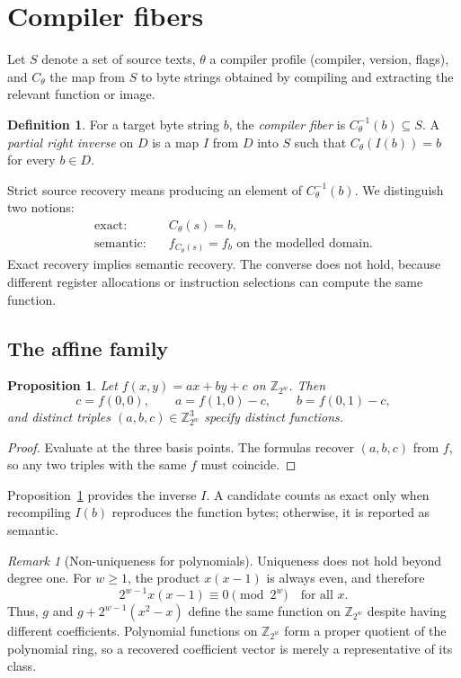 \documentclass[11pt]{article}
\newtheorem{proposition}[theorem]{Proposition}
\theoremstyle{definition}
\newtheorem{definition}[theorem]{Definition}
\theoremstyle{remark}
\newtheorem{remark}[theorem]{Remark}
\newcommand{\Z}{\mathbb{Z}}
\begin{document}
\section{Compiler fibers}

Let $S$ denote a set of source texts, $\theta$ a compiler profile (compiler, version, flags), and $C_\theta$ the map from $S$ to byte strings obtained by compiling and extracting the relevant function or image.

\begin{definition}
For a target byte string $b$, the \emph{compiler fiber} is $C_\theta^{-1}(b) \subseteq S$. A \emph{partial right inverse} on $D$ is a map $I$ from $D$ into $S$ such that $C_\theta(I(b)) = b$ for every $b \in D$.
\end{definition}

Strict source recovery means producing an element of $C_\theta^{-1}(b)$. We distinguish two notions:
\begin{align*}
  \text{exact:} \quad & C_\theta(s) = b, \\
  \text{semantic:} \quad & f_{C_\theta(s)} = f_b \text{ on the modelled domain}.
\end{align*}
Exact recovery implies semantic recovery. The converse does not hold, because different register allocations or instruction selections can compute the same function.

\subsection{The affine family}

\begin{proposition}\label{prop:affine}
Let $f(x,y) = ax + by + c$ on $\Z_{2^w}$. Then
\[
  c = f(0,0), \qquad a = f(1,0) - c, \qquad b = f(0,1) - c,
\]
and distinct triples $(a,b,c) \in \Z_{2^w}^3$ specify distinct functions.
\end{proposition}

\begin{proof}
Evaluate at the three basis points. The formulas recover $(a,b,c)$ from $f$, so any two triples with the same $f$ must coincide.
\end{proof}

Proposition~\ref{prop:affine} provides the inverse $I$. A candidate counts as exact only when recompiling $I(b)$ reproduces the function bytes; otherwise, it is reported as semantic.

\begin{remark}[Non-uniqueness for polynomials]
Uniqueness does not hold beyond degree one. For $w \ge 1$, the product $x(x-1)$ is always even, and therefore
\[
  2^{w-1} x (x - 1) \equiv 0 \pmod{2^w} \quad \text{for all } x.
\]
Thus, $g$ and $g + 2^{w-1}(x^2 - x)$ define the same function on $\Z_{2^w}$ despite having different coefficients. Polynomial functions on $\Z_{2^w}$ form a proper quotient of the polynomial ring, so a recovered coefficient vector is merely a representative of its class.
\end{remark}
\end{document}
